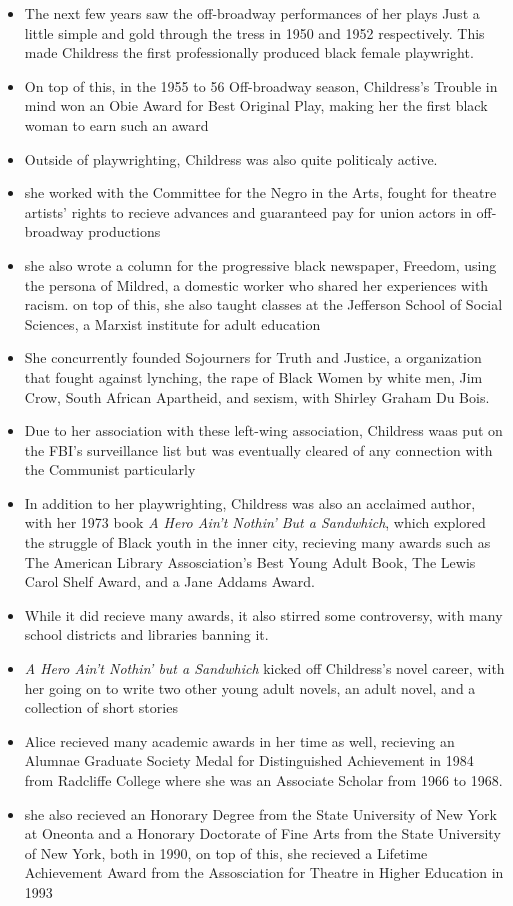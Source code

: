 \documentclass[12pt]{article}
\begin{document}
\begin{itemize}
			\item The next few years saw the off-broadway performances of her plays Just a little simple and gold through the tress in 1950 and 1952 respectively. This made Childress the first professionally produced black female playwright.
			\item On top of this, in the 1955 to 56 Off-broadway season, Childress's Trouble in mind won an Obie Award for Best Original Play, making her the first black woman to earn such an award
			\item Outside of playwrighting, Childress was also quite politicaly active.
			\item she worked with the Committee for the Negro in the Arts, fought for theatre artists' rights to recieve advances and guaranteed pay for union actors in off-broadway productions
			\item she also wrote a column for the progressive black newspaper, Freedom, using the persona of Mildred, a domestic worker who shared her experiences with racism. on top of this, she also taught classes at the Jefferson School of Social Sciences, a Marxist institute for adult education
			\item She concurrently founded Sojourners for Truth and Justice, a organization that fought against lynching, the rape of Black Women by white men, Jim Crow, South African Apartheid, and sexism, with Shirley Graham Du Bois.
			\item Due to her association with these left-wing association, Childress waas put on the FBI's surveillance list but was eventually cleared of any connection with the Communist particularly
			\item In addition to her playwrighting, Childress was also an acclaimed author, with her 1973 book \textit{A Hero Ain't Nothin' But a Sandwhich}, which explored the struggle of Black youth in the inner city, recieving many awards such as The American Library Assosciation's Best Young Adult Book, The Lewis Carol Shelf Award, and a Jane Addams Award.
			\item While it did recieve many awards, it also stirred some controversy, with many school districts and libraries banning it.
			\item \textit{A Hero Ain't Nothin' but a Sandwhich} kicked off Childress's novel career, with her going on to write two other young adult novels, an adult novel, and a collection of short stories
			\item Alice recieved many academic awards in her time as well, recieving an Alumnae Graduate Society Medal for Distinguished Achievement in 1984 from Radcliffe College where she was an Associate Scholar from 1966 to 1968.
			\item she also recieved an Honorary Degree from the State University of New York at Oneonta and a Honorary Doctorate of Fine Arts from the State University of New York, both in 1990, on top of this, she recieved a Lifetime Achievement Award from the Assosciation for Theatre in Higher Education in 1993
		\end{itemize}
    \newpage
    \printbibliography
\end{document}
